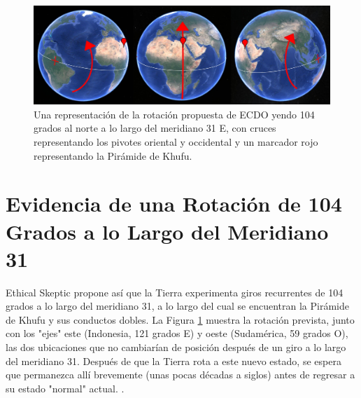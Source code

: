 \documentclass[10pt,twocolumn,letterpaper]{article}
\begin{document}
\begin{figure}[t]
\begin{center}
\includegraphics[width=1\textwidth]{drawing.jpg}
\end{center}
   \caption{Una representación de la rotación propuesta de ECDO yendo 104 grados al norte a lo largo del meridiano 31 E, con cruces representando los pivotes oriental y occidental y un marcador rojo representando la Pirámide de Khufu.}
\label{fig:6}
\end{figure}

\section{Evidencia de una Rotación de 104 Grados a lo Largo del Meridiano 31}

Ethical Skeptic propone así que la Tierra experimenta giros recurrentes de 104 grados a lo largo del meridiano 31, a lo largo del cual se encuentran la Pirámide de Khufu y sus conductos dobles. La Figura \ref{fig:6} muestra la rotación prevista, junto con los "ejes" este (Indonesia, 121 grados E) y oeste (Sudamérica, 59 grados O), las dos ubicaciones que no cambiarían de posición después de un giro a lo largo del meridiano 31. Después de que la Tierra rota a este nuevo estado, se espera que permanezca allí brevemente (unas pocas décadas a siglos) antes de regresar a su estado "normal" actual. \cite{150}.
\end{document}
